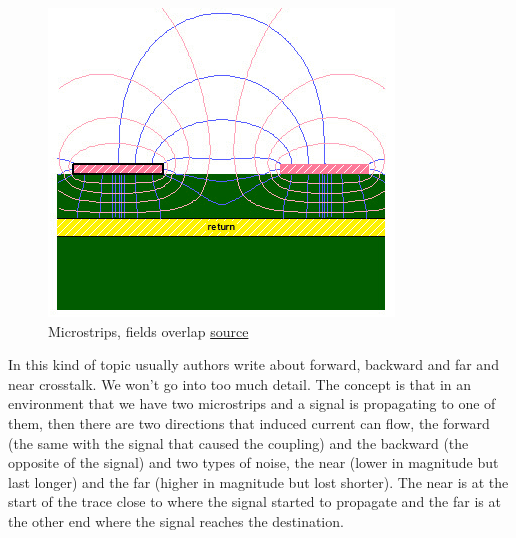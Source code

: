 \documentclass[final]{cubedoc}
\begin{document}
	\begin{figure}[h!]
		\centering
		\includegraphics[keepaspectratio, height=.3\textheight, width = \textwidth]{assets/fringe_fields.png}
		\caption{Microstrips, fields overlap \href{https://www.signalintegrityjournal.com/blogs/4-eric-bogatin-signal-integrity-journal-technical-editor/post/402-pop-quiz-use-tight-or-loosely-coupled-differential-pairs-to-reduce-cross-talk}{source}}
	\end{figure}
	
	
	In this kind of topic usually authors write about forward, backward and far and near crosstalk. We won't go into too much detail. The concept is that in an environment that we have two microstrips and a signal is propagating to one of them, then there are two directions that induced current can flow, the forward (the same with the signal that caused the coupling) and the backward (the opposite of the signal) and two types of noise, the near (lower in magnitude but last longer) and the far (higher in magnitude but lost shorter). The near is at the start of the trace close to where the signal started to propagate  and the far is at the other end where the signal reaches the destination.
	
\end{document}
